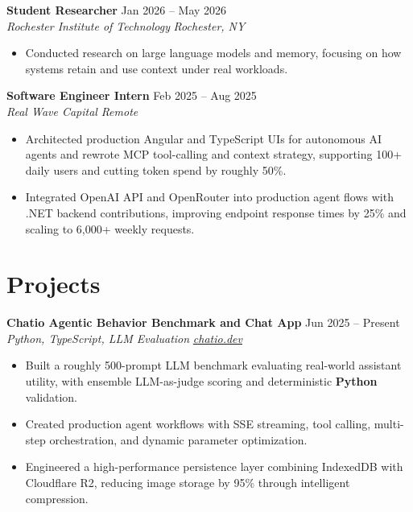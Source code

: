 \documentclass[10pt,letterpaper]{article}
\newif\ifresumeFirstRole
\newcommand{\resumeRole}[4]{%
  \ifresumeFirstRole
    \global\resumeFirstRolefalse
  \else
    \vspace{0pt plus 1fill}%
  \fi
  \textbf{#1} \hfill #2\\
  \textit{#3} \hfill \textit{#4}
}
\begin{document}
\resumeRole{Student Researcher}{Jan 2026 -- May 2026}{Rochester Institute of Technology}{Rochester, NY}
\begin{itemize}
  \item Conducted research on large language models and memory, focusing on how systems retain and use context under real workloads.
\end{itemize}

\resumeRole{Software Engineer Intern}{Feb 2025 -- Aug 2025}{Real Wave Capital}{Remote}
\begin{itemize}
  \item Architected production Angular and TypeScript UIs for autonomous AI agents and rewrote MCP tool-calling and context strategy, supporting 100+ daily users and cutting token spend by roughly 50\%.
  \item Integrated OpenAI API and OpenRouter into production agent flows with .NET backend contributions, improving endpoint response times by 25\% and scaling to 6,000+ weekly requests.
\end{itemize}

\section*{Projects}
\resumeRole{Chatio Agentic Behavior Benchmark and Chat App}{Jun 2025 -- Present}{Python, TypeScript, LLM Evaluation}{\href{https://chatio.dev}{chatio.dev}}
\begin{itemize}
  \item Built a roughly 500-prompt LLM benchmark evaluating real-world assistant utility, with ensemble LLM-as-judge scoring and deterministic \textbf{Python} validation.
  \item Created production agent workflows with SSE streaming, tool calling, multi-step orchestration, and dynamic parameter optimization.
  \item Engineered a high-performance persistence layer combining IndexedDB with Cloudflare R2, reducing image storage by 95\% through intelligent compression.
\end{itemize}
\end{document}
